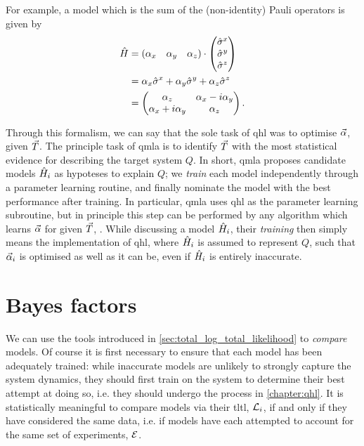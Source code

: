 For example, a model which is the sum of the (non-identity) Pauli operators is given by
\begin{align}
    \label{eqn:pauli_sum_model}
    \begin{split}
        \hat{H} &= \begin{matrix}(\alpha_x & \alpha_y & \alpha_z)\end{matrix} \cdot \left(\begin{matrix}\hat{\sigma}^{x} \\ \hat{\sigma}^{y} \\ \hat{\sigma}^{z}\end{matrix}\right) \\
        &= \alpha_x \hat{\sigma}^{x} + \alpha_y \hat{\sigma}^{y} + \alpha_z \hat{\sigma}^{z} \\
        &= \begin{pmatrix}
            \alpha_z & \alpha_x - i \alpha_y \\
            \alpha_x + i\alpha_y & \alpha_z
        \end{pmatrix}.
    \end{split}
\end{align}
\par 

Through this formalism, we can say that the sole task of \gls{qhl} was to optimise $\vec{\alpha}$, given ${ \vec{T} }$. 
The principle task of \gls{qmla} is to identify ${ \vec{T} }$ with the most statistical evidence 
    for describing the target system $Q$. 
In short, \gls{qmla} proposes candidate models $\hat{H}_i$ as hypoteses to explain $Q$; 
    we \emph{train} each model independently through a parameter learning routine, 
    and finally nominate the model with the best performance after training. 
In particular, \gls{qmla} uses \gls{qhl} as the parameter learning subroutine, 
    but in principle this step can be performed by any algorithm which learns $\vec{\alpha}$ for given ${ \vec{T} }$, 
    \cite{wang2015hamiltonian, krastanov2019stochastic, flurin2020using, niu2019learning, greplova2017quantum,lokhov2018optimal}. 
While discussing a model $\hat{H}_i$, their \emph{training} then simply means the implementation 
    of \gls{qhl}, where $\hat{H}_i$ is assumed to represent $Q$, 
    such that $\vec{\alpha}_i$ is optimised as well as it can be, even if $\hat{H}_i$ is entirely inaccurate. 

\section{Bayes factors}\label{sec:bayes_factors}
We can use the tools introduced in \cref{sec:total_log_total_likelihood} to \emph{compare} models. 
Of course it is first necessary to ensure that each model has  
    been adequately trained: while inaccurate models are unlikely to strongly 
    capture the system dynamics, they should first train on the system 
    to determine their best attempt at doing so, 
    i.e. they should undergo the process in \cref{chapter:qhl}.
It is statistically meaningful to compare models via their \gls{tltl}, ${\mathcal{L}}_i$, 
    if and only if they have considered the same data, 
    i.e. if models have each attempted to account for the same set of experiments, ${ \mathcal{E} }$.
\par 

